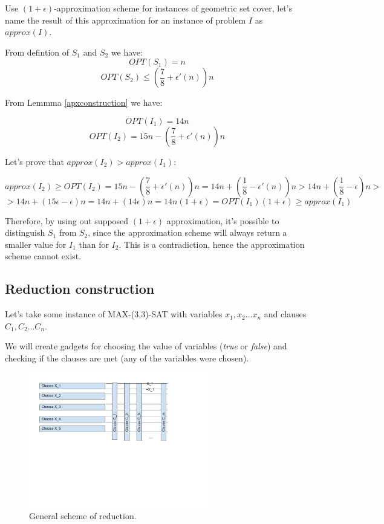 Use $(1+\epsilon)$-approximation scheme for instances of geometric
set cover, let's name the result of this approximation
for an instance of problem $I$ as $approx(I)$.

From defintion of $S_1$ and $S_2$ we have:
$$OPT(S_1) = n$$
$$OPT(S_2) \le (\frac{7}{8} + \epsilon'(n))n$$

From Lemmma \ref{apxconstruction} we have:

$$OPT(I_1) = 14n$$
$$OPT(I_2) = 15n - (\frac{7}{8} + \epsilon'(n))n$$

Let's prove that $approx(I_2) > approx(I_1)$:

$$approx(I_2) \ge OPT(I_2) = 15n - (\frac{7}{8} + \epsilon'(n))n
	= 14n + (\frac{1}{8} - \epsilon'(n))n
	> 14n + (\frac{1}{8} - \epsilon)n > $$
$$	> 14n + (15\epsilon - \epsilon)n
	= 14n + (14\epsilon)n
	= 14n(1+\epsilon)
	= OPT(I_1)(1+\epsilon) \ge approx(I_1)$$ 



Therefore, by using out supposed $(1+\epsilon)$ approximation,
it’s possible to distinguish $S_1$ from $S_2$, since
the approximation scheme will always return a smaller value
for $I_1$ than for $I_2$. This is a contradiction,
hence the approximation scheme cannot exist.

\subsection{Reduction construction}
\label{reduction_construction}

Let's take some instance of  MAX-(3,3)-SAT with
variables $x_1, x_2 \ldots x_n$
and clauses $C_1, C_2 \dots C_n$.

We will create gadgets for choosing the value
of variables (\textit{true} or \textit{false}) and checking
if the clauses are met (any of the variables were chosen).

\begin{figure}[h]
\includegraphics[width=0.7\textwidth]{segment_apx_sketch.jpg}
\caption{General scheme of reduction.}
\label{fig:segment_apx}
\end{figure}

